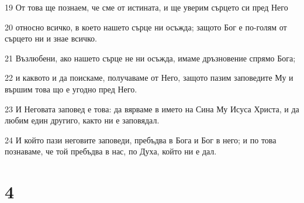 \par 19 От това ще познаем, че сме от истината, и ще уверим сърцето си пред Него
\par 20 относно всичко, в което нашето сърце ни осъжда; защото Бог е по-голям от сърцето ни и знае всичко.
\par 21 Възлюбени, ако нашето сърце не ни осъжда, имаме дръзновение спрямо Бога;
\par 22 и каквото и да поискаме, получаваме от Него, защото пазим заповедите Му и вършим това що е угодно пред Него.
\par 23 И Неговата заповед е това: да вярваме в името на Сина Му Исуса Христа, и да любим един другиго, както ни е заповядал.
\par 24 И който пази неговите заповеди, пребъдва в Бога и Бог в него; и по това познаваме, че той пребъдва в нас, по Духа, който ни е дал.

\chapter{4}

